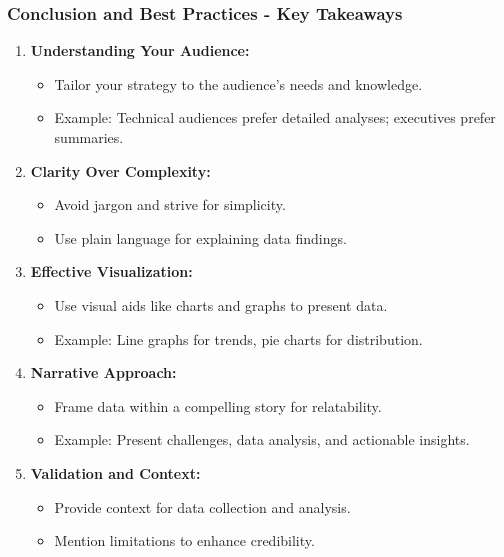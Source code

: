 \documentclass{beamer}
\begin{document}
\begin{frame}[fragile]
    \frametitle{Conclusion and Best Practices - Key Takeaways}
    \begin{enumerate}
        \item \textbf{Understanding Your Audience:}
        \begin{itemize}
            \item Tailor your strategy to the audience's needs and knowledge.
            \item Example: Technical audiences prefer detailed analyses; executives prefer summaries.
        \end{itemize}
        
        \item \textbf{Clarity Over Complexity:}
        \begin{itemize}
            \item Avoid jargon and strive for simplicity.
            \item Use plain language for explaining data findings.
        \end{itemize}
        
        \item \textbf{Effective Visualization:}
        \begin{itemize}
            \item Use visual aids like charts and graphs to present data.
            \item Example: Line graphs for trends, pie charts for distribution.
        \end{itemize}
        
        \item \textbf{Narrative Approach:}
        \begin{itemize}
            \item Frame data within a compelling story for relatability.
            \item Example: Present challenges, data analysis, and actionable insights.
        \end{itemize}
        
        \item \textbf{Validation and Context:}
        \begin{itemize}
            \item Provide context for data collection and analysis.
            \item Mention limitations to enhance credibility.
        \end{itemize}
    \end{enumerate}
\end{frame}
\end{document}
